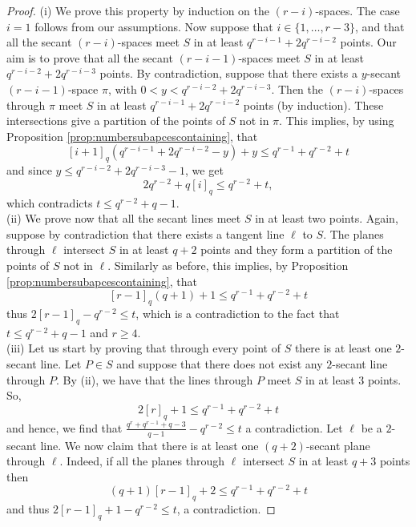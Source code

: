 \documentclass[11pt]{amsart}
\begin{document}
\begin{proof}
(i) %
We prove this property by induction on the $(r-i)$-spaces.
The case $i=1$ follows from our assumptions.
Now suppose that $i \in \{1,\ldots,r-3\}$, and that all the secant $(r-i)$-spaces meet $S$ in at least $q^{r-i-1}+2q^{r-i-2}$ points.
Our aim is to prove that all the secant $(r-i-1)$-spaces meet $S$ in at least $q^{r-i-2}+2q^{r-i-3}$ points. By contradiction, suppose that there exists a $y$-secant $(r-i-1)$-space $\pi$, with $0 < y < q^{r-i-2}+2q^{r-i-3}$.
Then the $(r-i)$-spaces through $\pi$ meet $S$ in at least $q^{r-i-1}+2q^{r-i-2}$ points (by induction). These intersections give a partition of the points of $S$ not in $\pi$. This implies, by using Proposition \ref{prop:numbersubapcescontaining}, that
\[
[i+1]_q(q^{r-i-1}+2q^{r-i-2} -y)+y \leq q^{r-1}+q^{r-2}+t  
\]
and since $y \leq q^{r-i-2}+2q^{r-i-3}-1$, we get
\[2q^{r-2}+q[i]_q \leq q^{r-2}+t,\] which contradicts $t \leq q^{r-2}+q-1$. \\
(ii) We prove now that all the secant lines meet $S$ in at least two points. Again, suppose by contradiction that there exists a tangent line $\ell$ to $S$. The planes through $\ell$ intersect $S$ in at least $q+2$ points and they form a partition of the points of $S$ not in $\ell$. Similarly as before, this implies, by Proposition \ref{prop:numbersubapcescontaining}, that
\[
[r-1]_q(q+1)+1 \leq q^{r-1}+q^{r-2}+t
\]
thus $2[r-1]_q-q^{r-2} \leq t$, which is a contradiction to the fact that $t\leq q^{r-2}+q-1$ and $r \geq 4$.\\ 
(iii) Let us start by proving that through every point of $S$ there is at least one $2$-secant line.
Let $P \in S$ and suppose that there does not exist any $2$-secant line through $P$. By (ii), we have that the lines through $P$ meet $S$ in at least $3$ points. So,
\[
2[r]_q+1\leq q^{r-1}+q^{r-2}+t
\]
and hence, we find that $\frac{q^r+q^{r-1}+q-3}{q-1}-q^{r-2} \leq t$ a contradiction. 
Let $\ell$ be a $2$-secant line. We now claim that there is at least one $(q+2)$-secant plane through $\ell$. Indeed, if all the planes through $\ell$ intersect $S$ in at least $q+3$ points then 
\[
(q+1)[r-1]_q +2\leq q^{r-1}+q^{r-2}+t
\]
and thus $2[r-1]_q+1 -q^{r-2}\leq t$, a contradiction.


\end{proof}
\end{document}
